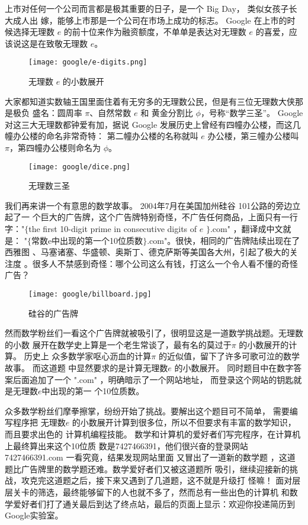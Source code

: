 上市对任何一个公司而言都是极其重要的日子，是一个 Big Day， 类似女孩子长大成人出
嫁，能够上市那是一个公司在市场上成功的标志。 Google 在上市的时候选择无理数 $e$
的前十位来作为融资额度，不单单是表达对无理数 $e$ 的喜爱，应该说这是在致敬无理数
$e$。

\begin{figure}[htbp]
\centering
\texttt{[image: google/e-digits.png]}
\caption{无理数 $e$ 的小数展开}
\centering
\end{figure}
大家都知道实数轴王国里面住着有无穷多的无理数公民，但是有三位无理数大侠那是极负
盛名：圆周率 $\pi$、自然常数 $e$ 和 黄金分割比 $\phi$，号称“数学三圣”。
Google 对这三大无理数都钟爱有加，据说 Google 发展历史上曾经有四幢办公楼，而这几
幢办公楼的命名非常奇特： 第二幢办公楼的名称就叫 $e$ 办公楼，第三幢办公楼叫
$\pi$，第四幢办公楼则命名为 $\phi$。

\begin{figure}[htbp]
\centering
\texttt{[image: google/dice.png]}
\caption{无理数三圣}
\centering
\end{figure}

我们再来讲一个有意思的数学故事。 2004年7月在美国加州硅谷 101公路的旁边立起了一
个巨大的广告牌，这个广告牌特别奇怪，不广告任何商品，上面只有一行字："$\{$the
first 10-digit prime in consecutive digits of $e$ $\}$.com" ，翻译成中文就是：
"$\{$常数e中出现的第一个10位质数$\}$.com"。很快，相同的广告牌陆续出现在了西雅图
、马塞诸塞、华盛顿、奥斯丁、德克萨斯等美国各大州，引起了极大的关注度
。很多人不禁感到奇怪：哪个公司这么有钱，打这么一个令人看不懂的奇怪广告？

\begin{figure}[htbp]
\centering
\texttt{[image: google/billboard.jpg]}
\caption{硅谷的广告牌}
\centering
\end{figure}

然而数学粉丝们一看这个广告牌就被吸引了，很明显这是一道数学挑战题。无理数的小数
展开在数学史上算是一个老生常谈了，最有名的莫过于$\pi$ 的小数展开的计算。 历史上
众多数学家呕心沥血的计算$\pi$ 的近似值，留下了许多可歌可泣的数学故事。 而这道题
中显然要求的是计算无理数$e$ 的小数展开。 同时题目中在数字答案后面追加了一个
".com" ，明确暗示了一个网站地址， 而登录这个网站的钥匙就是无理数$e$中出现的第一
个10位质数。

众多数学粉丝们摩拳擦掌，纷纷开始了挑战。要解出这个题目可不简单， 需要编写程序把
无理数$e$ 的小数展开计算到很多位，所以不但要求有丰富的数学知识，而且要求出色的
计算机编程技能。 数学和计算机的爱好者们写完程序，在计算机上最终算出来这个10位质
数是7427466391，他们很兴奋的登录网站 7427466391.com 一看究竟，结果发现网站里面
又冒出了一道新的数学题 ，这道题比广告牌里的数学题还难。数学爱好者们又被这道题所
吸引，继续迎接新的挑战，攻克完这道题之后，接下来又遇到了几道题，这不就是升级打
怪嘛！ 面对层层关卡的筛选，最终能够留下的人也就不多了，然而总有一些出色的计算机
和数学爱好者们打了通关最后到达了终点站，最后的页面上显示：欢迎你投递简历到
Google实验室。

